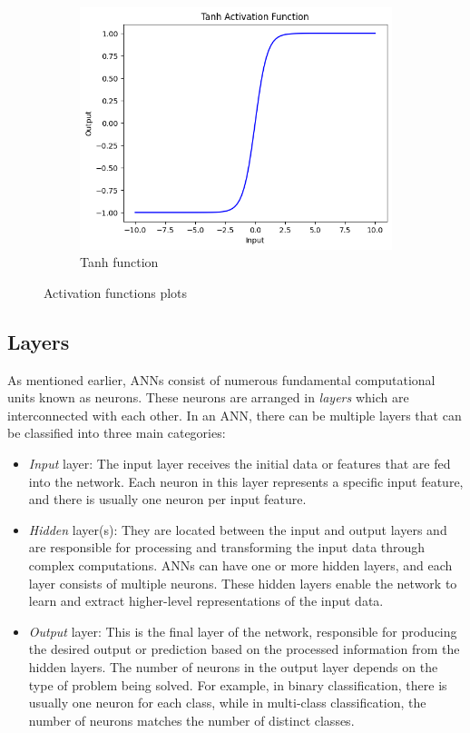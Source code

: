 \begin{figure}[h]
\begin{subfigure}{.33\textwidth}
		\includegraphics[width=0.9\linewidth]{ImageFiles/NeuralNetworks/tanh}
		\caption{Tanh function}
		\label{fig:tanh}
	\end{subfigure}
	\caption{Activation functions plots}
\end{figure}

\subsection{Layers}

As mentioned earlier, ANNs consist of numerous fundamental computational units known as neurons. These neurons are arranged in \textit{layers} which are interconnected with each other. In an ANN, there can be multiple layers that can be classified into three main categories:

\begin{itemize}
	\item \textit{Input} layer: The input layer receives the initial data or features that are fed into the network. Each neuron in this layer represents a specific input feature, and there is usually one neuron per input feature.
	
	\item \textit{Hidden} layer(s): They are located between the input and output layers and are responsible for processing and transforming the input data through complex computations. ANNs can have one or more hidden layers, and each layer consists of multiple neurons. These hidden layers enable the network to learn and extract higher-level representations of the input data.
	
	\item \textit{Output} layer: This is the final layer of the network, responsible for producing the desired output or prediction based on the processed information from the hidden layers. The number of neurons in the output layer depends on the type of problem being solved. For example, in binary classification, there is usually one neuron for each class, while in multi-class classification, the number of neurons matches the number of distinct classes.
\end{itemize}

